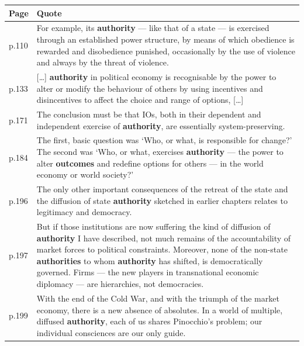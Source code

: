 \small
\begin{longtable}{p{1.2cm} p{13cm}}
\toprule
\textbf{Page} & \textbf{Quote} \\
\midrule
\endhead

p.110 & For example, its \textbf{authority} --- like that of a state --- is exercised through an established power structure, by means of which obedience is rewarded and disobedience punished, occasionally by the use of violence and always by the threat of violence. \\
\midrule

p.133 & {[}\ldots{]} \textbf{authority} in political economy is recognisable by the power to alter or modify the behaviour of others by using incentives and disincentives to affect the choice and range of options, {[}\ldots{]} \\
\midrule

p.171 & The conclusion must be that IOs, both in their dependent and independent exercise of \textbf{authority}, are essentially system-preserving. \\
\midrule

p.184 & The first, basic question was `Who, or what, is responsible for change?' The second was `Who, or what, exercises \textbf{authority} --- the power to alter \textbf{outcomes} and redefine options for others --- in the world economy or world society?' \\
\midrule

p.196 & The only other important consequences of the retreat of the state and the diffusion of state \textbf{authority} sketched in earlier chapters relates to legitimacy and democracy. \\
\midrule

p.197 & But if those institutions are now suffering the kind of diffusion of \textbf{authority} I have described, not much remains of the accountability of market forces to political constraints. Moreover, none of the non-state \textbf{authorities} to whom \textbf{authority} has shifted, is democratically governed. Firms --- the new players in transnational economic diplomacy --- are hierarchies, not democracies. \\
\midrule

p.199 & With the end of the Cold War, and with the triumph of the market economy, there is a new absence of absolutes. In a world of multiple, diffused \textbf{authority}, each of us shares Pinocchio's problem; our individual consciences are our only guide. \\
\bottomrule
\end{longtable}

